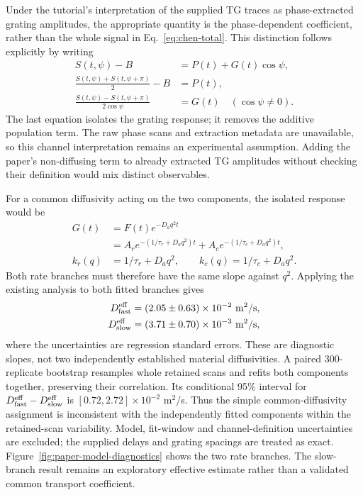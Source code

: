 \documentclass[11pt,a4paper]{article}
\begin{document}
Under the tutorial's interpretation of the supplied TG traces as phase-extracted grating amplitudes, the appropriate quantity is the phase-dependent coefficient, rather than the whole signal in Eq.~\eqref{eq:chen-total}. This distinction follows explicitly by writing
\begin{align}
S(t,\psi)-B&=P(t)+G(t)\cos\psi,\\
\frac{S(t,\psi)+S(t,\psi+\pi)}{2}-B&=P(t),\\
\frac{S(t,\psi)-S(t,\psi+\pi)}{2\cos\psi}&=G(t)\quad(\cos\psi\ne0).
\end{align}
The last equation isolates the grating response; it removes the additive population term. The raw phase scans and extraction metadata are unavailable, so this channel interpretation remains an experimental assumption. Adding the paper's non-diffusing term to already extracted TG amplitudes without checking their definition would mix distinct observables.

For a common diffusivity acting on the two components, the isolated response would be
\begin{align}
G(t)&=F(t)e^{-D_aq^2t}\\
&=A_r e^{-(1/\tau_r+D_aq^2)t}+A_c e^{-(1/\tau_c+D_aq^2)t},\\
k_r(q)&=1/\tau_r+D_aq^2,\qquad
k_c(q)=1/\tau_c+D_aq^2.
\end{align}
Both rate branches must therefore have the same slope against $q^2$. Applying the existing analysis to both fitted branches gives
\begin{align}
D_{\rm fast}^{\rm eff}&=(2.05\pm0.63)\times10^{-2}\ \mathrm{m^2/s},\\
D_{\rm slow}^{\rm eff}&=(3.71\pm0.70)\times10^{-3}\ \mathrm{m^2/s},
\end{align}
where the uncertainties are regression standard errors. These are diagnostic slopes, not two independently established material diffusivities. A paired 300-replicate bootstrap resamples whole retained scans and refits both components together, preserving their correlation. Its conditional 95\% interval for $D_{\rm fast}^{\rm eff}-D_{\rm slow}^{\rm eff}$ is $[0.72,2.72]\times10^{-2}$ m$^2$/s. Thus the simple common-diffusivity assignment is inconsistent with the independently fitted components within the retained-scan variability. Model, fit-window and channel-definition uncertainties are excluded; the supplied delays and grating spacings are treated as exact. Figure~\ref{fig:paper-model-diagnostics} shows the two rate branches. The slow-branch result remains an exploratory effective estimate rather than a validated common transport coefficient.
\end{document}
